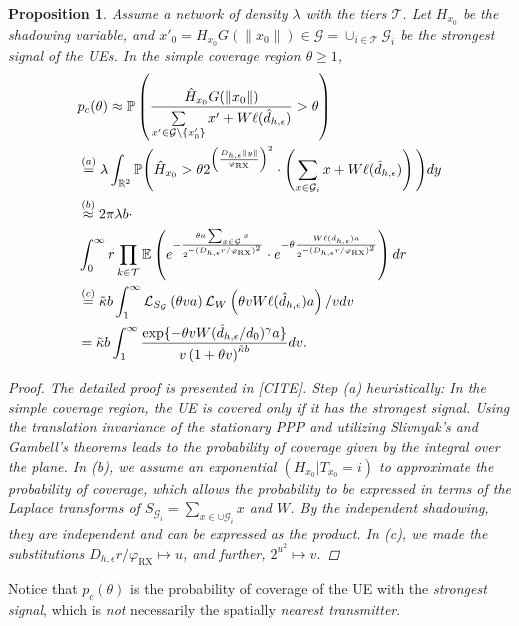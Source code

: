 \documentclass[conference]{IEEEtran}
\newcommand{\R}{\mathbb{R}}
\theoremstyle{definition}
\theoremstyle{plain}
\newtheorem{prop}[thm4]{Proposition}
\begin{document}
                    \begin{prop}
            Assume a network of density $\lambda$ with the tiers $\mathcal{T}$. Let $H_{x_0}$ be the shadowing variable, and ${x'}_0 =  H_{x_0}G(\|x_0\|) \in \mathcal{G} =\cup_{i \in \mathcal{T}} \mathcal{G}_i$ be the strongest signal of the UEs. In the simple coverage region $\theta \geq 1$,
            \begin{align}
              \label{eq:probofcov}
              &p_c(\theta) \approx \mathbb{P}\left( \frac{\hat{H}_{x_0} G(\|x_0\|)}{\sum\limits_{x' \in   \mathcal{G} \setminus \{x'_0\}}x'  + W\ell(\hat{d}_{h,\epsilon})} > \theta \right) \nonumber \\      
              &\overset{(a)}=  \lambda \int_{ \R^2}\mathbb{P}\Bigg(\hat{H}_{x_0} > \theta  2^{\left(\frac{D_{h,\epsilon}\|y\|}{\varphi_{\textup{RX}}}\right)^2 } \cdot \left(\sum_{x \in \mathcal{G}_i }x +W\ell(\hat{d}_{h,\epsilon}) \right)\Bigg) \nonumber dy  \nonumber  \\              
              &\overset{(b)}{\approx} 2 \pi \lambda b \cdot \nonumber \\
              &\int_{0}^{\infty} r \prod_{k \in \mathcal{T}}\mathbb{E} \left(e^{-\frac{\theta a \sum_{x \in { \mathcal{G}}} x}{2^{-(D_{h,\epsilon}r/\varphi_{\textup{RX}})^2}   }} \cdot e^{- \theta   \frac{W\ell(\hat{d}_{h,\epsilon})a}{2^{-(D_{h,\epsilon}r/\varphi_{\textup{RX}})^2} }} \right) dr \nonumber \\
              &\overset{(c)}{=}  \tilde{\kappa}b\int_1^{\infty} \mathcal{L}_{S_{\mathcal{G}}}\left(\theta v a \right)  \mathcal{L}_{W}\left( \theta vW\ell(\hat{d}_{h,\epsilon})a \right)/v dv \nonumber \\
              &\overset{}{=}   {} \tilde{\kappa}b\int_1^{\infty}  \frac{\exp \{- \theta v W(\hat{d}_{h,\epsilon}/d_0)^{\gamma}  a\}}{v\left(1 + \theta v  \right)^{\tilde{\kappa}b}} dv.
            \end{align}
            
            \begin{proof}
              The detailed proof is presented in [CITE]. Step (a) heuristically: In the simple coverage region, the UE is covered \textit{only if} it has the strongest signal. Using the translation invariance of the stationary PPP and utilizing Slivnyak's and Gambell's theorems leads to the probability of coverage given by the integral over the plane.
              In (b), we assume an exponential $(H_{x_0}|T_{x_0}=i)$ to approximate the probability of coverage, which allows the probability to be expressed in terms of the Laplace transforms of $S_{\mathcal{G}_i} = \sum_{x \in \cup \mathcal{G}_i}x$ and $W$. By the independent shadowing, they are independent and can be expressed as the product. In (c), we made the substitutions $D_{h,\epsilon}r/\varphi_{\text{RX}} \mapsto u$, and further, $2^{u^2} \mapsto v$.
              
            \end{proof}
                    \end{prop}
          Notice that $p_c(\theta)$ is the probability of coverage of the UE with the \textit{strongest signal}, which is \textit{not} necessarily the spatially  \textit{nearest transmitter}.
\end{document}
